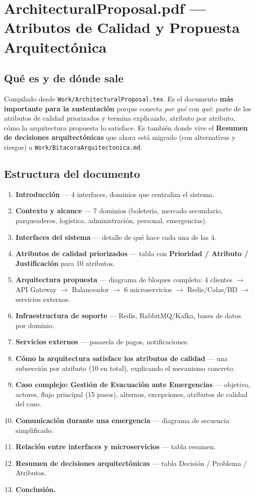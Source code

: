 \documentclass[12pt,a4paper]{article}
\begin{document}
\section{ArchitecturalProposal.pdf --- Atributos de Calidad y Propuesta Arquitectónica}

\subsection{Qué es y de dónde sale}

Compilado desde \texttt{Work/ArchitecturalProposal.tex}. Es el documento \textbf{más importante
para la sustentación} porque conecta \textit{por qué} con \textit{qué}: parte de los atributos de
calidad priorizados y termina explicando, atributo por atributo, cómo la arquitectura propuesta lo
satisface. Es también donde vive el \textbf{Resumen de decisiones arquitectónicas} que ahora está
migrado (con alternativas y riesgos) a \texttt{Work/BitacoraArquitectonica.md}.

\subsection{Estructura del documento}

\begin{enumerate}
\item \textbf{Introducción} --- 4 interfaces, dominios que centraliza el sistema.
\item \textbf{Contexto y alcance} --- 7 dominios (boletería, mercado secundario, parqueaderos,
logística, administración, personal, emergencias).
\item \textbf{Interfaces del sistema} --- detalle de qué hace cada una de las 4.
\item \textbf{Atributos de calidad priorizados} --- tabla con \textbf{Prioridad / Atributo /
Justificación} para 10 atributos.
\item \textbf{Arquitectura propuesta} --- diagrama de bloques completo: 4 clientes $\to$ API
Gateway $\to$ Balanceador $\to$ 6 microservicios $\to$ Redis/Colas/BD $\to$ servicios externos.
\item \textbf{Infraestructura de soporte} --- Redis, RabbitMQ/Kafka, bases de datos por dominio.
\item \textbf{Servicios externos} --- pasarela de pagos, notificaciones.
\item \textbf{Cómo la arquitectura satisface los atributos de calidad} --- una subsección por
atributo (10 en total), explicando el mecanismo concreto.
\item \textbf{Caso complejo: Gestión de Evacuación ante Emergencias} --- objetivo, actores, flujo
principal (15 pasos), alternos, excepciones, atributos de calidad del caso.
\item \textbf{Comunicación durante una emergencia} --- diagrama de secuencia simplificado.
\item \textbf{Relación entre interfaces y microservicios} --- tabla resumen.
\item \textbf{Resumen de decisiones arquitectónicas} --- tabla Decisión / Problema / Atributos.
\item \textbf{Conclusión.}
\end{enumerate}
\end{document}
